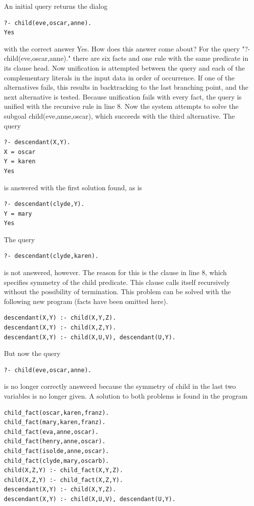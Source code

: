 \documentclass[10pt]{book}
\begin{document}
An initial query returns the dialog
\begin{verbatim}
?- child(eve,oscar,anne).
Yes
\end{verbatim}
with the correct answer Yes. How does this answer come about? For the query "?- child(eve,oscar,anne)." there are six facts and one rule with the same predicate in its clause head. Now unification is attempted between the query and each of the complementary literals in the input data in order of occurrence. If one of the alternatives fails, this results in backtracking to the last branching point, and the next alternative is tested. Because unification fails with every fact, the query is unified with the recursive rule in line 8. Now the system attempts to solve the subgoal child(eve,anne,oscar), which succeeds with the third alternative. The query
\begin{verbatim}
?- descendant(X,Y).
X = oscar
Y = karen
Yes
\end{verbatim}
is answered with the first solution found, as is
\begin{verbatim}
?- descendant(clyde,Y).
Y = mary
Yes
\end{verbatim}
The query
\begin{verbatim}
?- descendant(clyde,karen).
\end{verbatim}
is not answered, however. The reason for this is the clause in line 8, which specifies symmetry of the child predicate. This clause calls itself recursively without the possibility of termination. This problem can be solved with the following new program (facts have been omitted here).
\begin{verbatim}
descendant(X,Y) :- child(X,Y,Z).
descendant(X,Y) :- child(X,Z,Y).
descendant(X,Y) :- child(X,U,V), descendant(U,Y).
\end{verbatim}

But now the query
\begin{verbatim}
?- child(eve,oscar,anne).
\end{verbatim}
is no longer correctly answered because the symmetry of child in the last two variables is no longer given. A solution to both problems is found in the program
\begin{verbatim}
child_fact(oscar,karen,franz).
child_fact(mary,karen,franz).
child_fact(eva,anne,oscar).
child_fact(henry,anne,oscar).
child_fact(isolde,anne,oscar).
child_fact(clyde,mary,oscarb).
child(X,Z,Y) :- child_fact(X,Y,Z).
child(X,Z,Y) :- child_fact(X,Z,Y).
descendant(X,Y) :- child(X,Y,Z).
descendant(X,Y) :- child(X,U,V), descendant(U,Y).
\end{verbatim}
\end{document}
